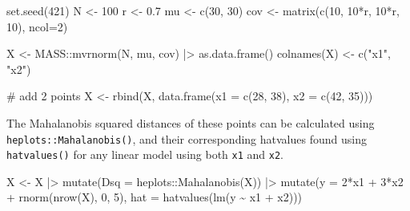 \documentclass[
  letterpaper,
  10pt,
  krantz2]{krantz}
\makeatletter
\newenvironment{Shaded}{\begin{snugshade}}{\end{snugshade}}
\newcommand{\AttributeTok}[1]{\textcolor[rgb]{0.40,0.45,0.13}{#1}}
\newcommand{\CommentTok}[1]{\textcolor[rgb]{0.37,0.37,0.37}{#1}}
\newcommand{\DecValTok}[1]{\textcolor[rgb]{0.68,0.00,0.00}{#1}}
\newcommand{\FloatTok}[1]{\textcolor[rgb]{0.68,0.00,0.00}{#1}}
\newcommand{\FunctionTok}[1]{\textcolor[rgb]{0.28,0.35,0.67}{#1}}
\newcommand{\NormalTok}[1]{\textcolor[rgb]{0.00,0.23,0.31}{#1}}
\newcommand{\OtherTok}[1]{\textcolor[rgb]{0.00,0.23,0.31}{#1}}
\newcommand{\SpecialCharTok}[1]{\textcolor[rgb]{0.37,0.37,0.37}{#1}}
\newcommand{\StringTok}[1]{\textcolor[rgb]{0.13,0.47,0.30}{#1}}
\newenvironment{kframe}{%
  \medskip{}
  \setlength{\fboxsep}{.8em}
  \def\at@end@of@kframe{}%
  \ifinner\ifhmode%
  \def\at@end@of@kframe{\end{minipage}}%
  \begin{minipage}{\columnwidth}%
  \fi\fi%
  \def\FrameCommand##1{\hskip\@totalleftmargin \hskip-\fboxsep
  \colorbox{shadecolor}{##1}\hskip-\fboxsep
      \hskip-\linewidth \hskip-\@totalleftmargin \hskip\columnwidth}%
  \MakeFramed {\advance\hsize-\width
    \@totalleftmargin\z@ \linewidth\hsize
    \@setminipage}}%
{\par\unskip\endMakeFramed%
  \at@end@of@kframe}
\renewenvironment{Shaded}{\begin{kframe}}{\end{kframe}}
\makeatother
\begin{document}
\begin{Shaded}
\begin{Highlighting}[]
\FunctionTok{set.seed}\NormalTok{(}\DecValTok{421}\NormalTok{)}
\NormalTok{N }\OtherTok{\textless{}{-}} \DecValTok{100}
\NormalTok{r }\OtherTok{\textless{}{-}} \FloatTok{0.7}
\NormalTok{mu }\OtherTok{\textless{}{-}} \FunctionTok{c}\NormalTok{(}\DecValTok{30}\NormalTok{, }\DecValTok{30}\NormalTok{)}
\NormalTok{cov }\OtherTok{\textless{}{-}} \FunctionTok{matrix}\NormalTok{(}\FunctionTok{c}\NormalTok{(}\DecValTok{10}\NormalTok{,   }\DecValTok{10}\SpecialCharTok{*}\NormalTok{r,}
                \DecValTok{10}\SpecialCharTok{*}\NormalTok{r, }\DecValTok{10}\NormalTok{), }\AttributeTok{ncol=}\DecValTok{2}\NormalTok{)}

\NormalTok{X }\OtherTok{\textless{}{-}}\NormalTok{ MASS}\SpecialCharTok{::}\FunctionTok{mvrnorm}\NormalTok{(N, mu, cov) }\SpecialCharTok{|\textgreater{}} \FunctionTok{as.data.frame}\NormalTok{()}
\FunctionTok{colnames}\NormalTok{(X) }\OtherTok{\textless{}{-}} \FunctionTok{c}\NormalTok{(}\StringTok{"x1"}\NormalTok{, }\StringTok{"x2"}\NormalTok{)}

\CommentTok{\# add 2 points}
\NormalTok{X }\OtherTok{\textless{}{-}} \FunctionTok{rbind}\NormalTok{(X,}
           \FunctionTok{data.frame}\NormalTok{(}\AttributeTok{x1 =} \FunctionTok{c}\NormalTok{(}\DecValTok{28}\NormalTok{, }\DecValTok{38}\NormalTok{),}
                      \AttributeTok{x2 =} \FunctionTok{c}\NormalTok{(}\DecValTok{42}\NormalTok{, }\DecValTok{35}\NormalTok{)))}
\end{Highlighting}
\end{Shaded}

The Mahalanobis squared distances of these points can be calculated
using \texttt{heplots::Mahalanobis()}, and their corresponding hatvalues
found using \texttt{hatvalues()} for any linear model using both
\texttt{x1} and \texttt{x2}.

\begin{Shaded}
\begin{Highlighting}[]
\NormalTok{X }\OtherTok{\textless{}{-}}\NormalTok{ X }\SpecialCharTok{|\textgreater{}}
  \FunctionTok{mutate}\NormalTok{(}\AttributeTok{Dsq =}\NormalTok{ heplots}\SpecialCharTok{::}\FunctionTok{Mahalanobis}\NormalTok{(X)) }\SpecialCharTok{|\textgreater{}}
  \FunctionTok{mutate}\NormalTok{(}\AttributeTok{y =} \DecValTok{2}\SpecialCharTok{*}\NormalTok{x1 }\SpecialCharTok{+} \DecValTok{3}\SpecialCharTok{*}\NormalTok{x2 }\SpecialCharTok{+} \FunctionTok{rnorm}\NormalTok{(}\FunctionTok{nrow}\NormalTok{(X), }\DecValTok{0}\NormalTok{, }\DecValTok{5}\NormalTok{),}
         \AttributeTok{hat =} \FunctionTok{hatvalues}\NormalTok{(}\FunctionTok{lm}\NormalTok{(y }\SpecialCharTok{\textasciitilde{}}\NormalTok{ x1 }\SpecialCharTok{+}\NormalTok{ x2))) }
\end{Highlighting}
\end{Shaded}
\end{document}
